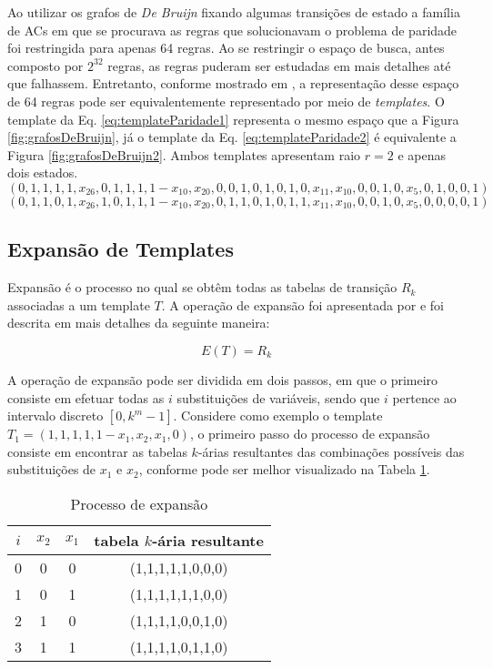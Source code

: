 Ao utilizar os grafos de \textit{De Bruijn} fixando algumas transições de estado a família de ACs em que se procurava as regras que solucionavam o problema de paridade foi restringida para apenas 64 regras. Ao se restringir o espaço de busca, antes composto por $2^{32}$ regras, as regras puderam ser estudadas em mais detalhes até que falhassem. Entretanto, conforme mostrado em \cite{Verardo2014}, a representação desse espaço de 64 regras pode ser equivalentemente representado por meio de \textit{templates}. O template da Eq. \eqref{eq:templateParidade1} representa o mesmo espaço que a Figura \ref{fig:grafosDeBruijn}, já o template da Eq. \eqref{eq:templateParidade2} é equivalente a Figura \ref{fig:grafosDeBruijn2}. Ambos templates apresentam raio $r=2$ e apenas dois estados.
\begin{equation}
\left(0,1,1,1,1,x_{26},0,1,1,1,1-x_{10},x_{20},0,0,1,0,1,0,1,0,x_{11},x_{10},0,0,1,0,x_5,0,1,0,0,1\right)
\label{eq:templateParidade1}
\end{equation}
\begin{equation}
\left(0,1,1,0,1,x_{26},1,0,1,1,1-x_{10},x_{20},0,1,1,0,1,0,1,1,x_{11},x_{10},0,0,1,0,x_5,0,0,0,0,1\right)
\label{eq:templateParidade2}
\end{equation}


\newpage\newpage
\subsection{Expansão de Templates}
Expansão é o processo no qual se obtêm todas as tabelas de transição $R_k$ associadas a um template $T$.
A operação de expansão foi apresentada por  e foi descrita em mais detalhes da seguinte maneira:

\begin{equation}
E(T)=R_k
\end{equation}

A operação de expansão pode ser dividida em dois passos, em que o primeiro consiste em efetuar todas as $i$ substituições de variáveis, sendo que $i$ pertence ao intervalo discreto $[0,k^m-1]$. Considere como exemplo o template $T_1 = (1,1,1,1,1-x_1,x_2,x_1,0)$, o primeiro passo do processo de expansão consiste em encontrar as tabelas $k$-árias resultantes das combinações possíveis das substituições de $x_1$ e $x_2$, conforme pode ser melhor visualizado na Tabela \ref{tab:expansionProcess}.

\begin{table}[h!]
\centering
\caption{Processo de expansão}
{
	\vspace{0.3cm}
	\begin{tabular}{cccc}
	\hline
	$i$ & $x_2$ & $x_1$ & tabela $k$-ária resultante \\
	\hline
	0	&	0	&	0	&	(1,1,1,1,1,0,0,0)	\\
	1	&	0	&	1	&	(1,1,1,1,1,1,0,0)	\\
	2	&	1	&	0	&	(1,1,1,1,0,0,1,0)	\\
	3	&	1	&	1	&	(1,1,1,1,0,1,1,0)	\\
	\hline
	\end{tabular}
}
\label{tab:expansionProcess}
\end{table}

